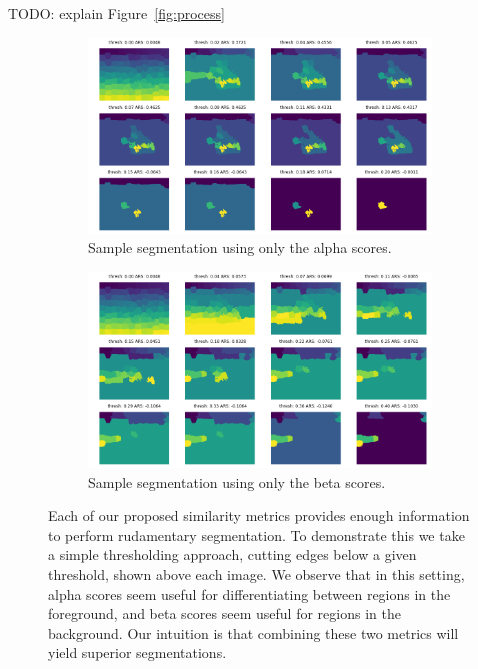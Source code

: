 \documentclass[twocolumn]{article}
\newcommand{\todo}[1]{}
\renewcommand{\todo}[1]{{\color{red} TODO: {#1}}}
\newcommand{\figref}[1]{Figure~\ref{fig:#1}}
\newcommand{\figlab}[1]{\label{fig:#1}}
\begin{document}
\todo{explain \figref{process}}

\begin{figure}[t]
  \centering

  \begin{subfigure}{0.49\linewidth}
    \includegraphics[width=\linewidth]{figs/only_alpha.png}
    \caption{Sample segmentation using only the alpha scores.}
  \end{subfigure}
  \begin{subfigure}{0.49\linewidth}
    \includegraphics[width=\linewidth]{figs/only_beta.png}
    \caption{Sample segmentation using only the beta scores.}
  \end{subfigure}

  \caption{
    Each of our proposed similarity metrics provides enough information to
    perform rudamentary segmentation. To demonstrate this we take a simple
    thresholding approach, cutting edges below a given threshold, shown above
    each image. 
    We observe that in this setting, alpha scores seem useful for
    differentiating between regions in the foreground, and beta scores seem
    useful for regions in the background. Our intuition is that combining these
    two metrics will yield superior segmentations.
  }
  \figlab{ab_only}
\end{figure}
\end{document}
